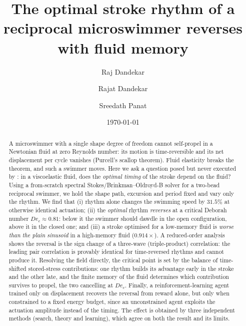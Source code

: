 \documentclass[11pt]{article}
\title{\vspace{-1.2cm}\bfseries The optimal stroke rhythm of a reciprocal
microswimmer reverses with fluid memory}
\author[1]{Raj Dandekar}
\author[1]{Rajat Dandekar}
\author[1]{Sreedath Panat}
\affil[1]{\normalfont Vizuara Research}
\affil[ ]{\normalfont\itshape Preprint --- a computational study. Code and data:
\texttt{github.com/RajatDandekar/swimmer-rhythm}}
\date{\today}
\newcommand{\De}{\mathit{De}}
\newcommand{\Dec}{\De_{c}}
\begin{document}
\maketitle
\vspace{-0.9cm}

\begin{abstract}
\noindent
A microswimmer with a single shape degree of freedom cannot self-propel in a Newtonian fluid at
zero Reynolds number: its motion is time-reversible and its net displacement per cycle vanishes
(Purcell's scallop theorem). Fluid elasticity breaks the theorem, and such a swimmer moves. Here
we ask a question posed but never executed by \citet{mj2012}: in a viscoelastic fluid, does the
\emph{optimal timing} of the stroke depend on the fluid? Using a from-scratch spectral
Stokes/Brinkman--Oldroyd-B solver for a two-bead reciprocal swimmer, we hold the shape path,
excursion and period fixed and vary only the rhythm. We find that (i) rhythm alone changes the
swimming speed by $31.5\%$ at otherwise identical actuation; (ii) the \emph{optimal} rhythm
\emph{reverses} at a critical Deborah number $\Dec\!\approx\!0.81$: below it the swimmer should
dawdle in the open configuration, above it in the closed one; and (iii) a stroke optimised for a
low-memory fluid is \emph{worse than the plain sinusoid} in a high-memory fluid ($0.914\times$).
A reduced-order analysis shows the reversal is the sign change of a three-wave (triple-product)
correlation: the leading pair correlation is provably identical for time-reversed rhythms and
cannot produce it. Resolving the field directly, the critical point is set by the balance of
time-shifted stored-stress contributions: one rhythm builds its advantage early in the stroke and
the other late, and the finite memory of the fluid determines which contribution survives to
propel, the two cancelling at $\Dec$. Finally, a reinforcement-learning agent trained only on
displacement recovers the reversal from reward alone, but only when constrained to a fixed energy
budget, since an unconstrained agent exploits the actuation amplitude instead of the timing. The
effect is obtained by three independent methods (search, theory and learning), which agree on both
the result and its limits.
\end{abstract}
\end{document}
